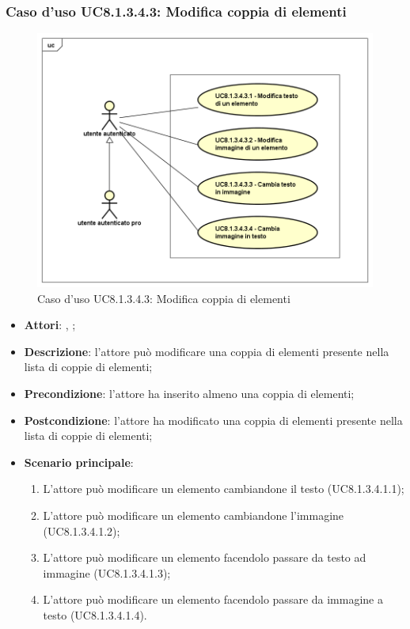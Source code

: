 	\subsubsection{Caso d'uso UC8.1.3.4.3: Modifica coppia di elementi}
	\label{UC8.1.3.4.3}
	\begin{figure}[h]
		\centering
		\includegraphics[scale=0.5,keepaspectratio]{UML/UC8_1_3_4_3.png}
		\caption{Caso d'uso UC8.1.3.4.3: Modifica coppia di elementi}
	\end{figure}
	\FloatBarrier
	\begin{itemize}
		\item \textbf{Attori}: \uau, \uaupro;
		\item \textbf{Descrizione}: l'attore può modificare una coppia di elementi presente nella lista di coppie di elementi;
		\item \textbf{Precondizione}: l'attore ha inserito almeno una coppia di elementi;
		\item \textbf{Postcondizione}: l'attore ha modificato una coppia di elementi presente nella lista di coppie di elementi; 
		\item \textbf{Scenario principale}: 
		\begin{enumerate}
			\item L'attore può modificare un elemento cambiandone il testo (UC8.1.3.4.1.1);
			\item L'attore può modificare un elemento cambiandone l'immagine (UC8.1.3.4.1.2);
			\item L'attore può modificare un elemento facendolo passare da testo ad immagine (UC8.1.3.4.1.3);
			\item L'attore può modificare un elemento facendolo passare da immagine a testo (UC8.1.3.4.1.4).	
		\end{enumerate}
	\end{itemize}
	
